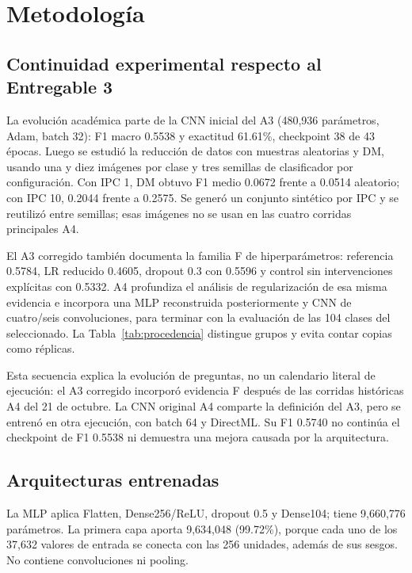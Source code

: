 \section{Metodología}
\subsection{Continuidad experimental respecto al Entregable 3}
La evolución académica parte de la CNN inicial del A3 (480,936 parámetros,
Adam, batch 32): F1 macro 0.5538 y exactitud 61.61\%, checkpoint 38 de 43 épocas.
Luego se estudió la reducción de datos con muestras aleatorias y DM, usando
una y diez imágenes por clase y tres semillas de clasificador por configuración.
Con IPC 1, DM obtuvo F1 medio 0.0672 frente a 0.0514 aleatorio; con IPC 10,
0.2044 frente a 0.2575. Se generó un conjunto sintético por IPC y se reutilizó
entre semillas; esas imágenes no se usan en las cuatro corridas principales A4.

El A3 corregido también documenta la familia F de hiperparámetros: referencia
0.5784, LR reducido 0.4605, dropout 0.3 con 0.5596 y control sin intervenciones
explícitas con 0.5332. A4 profundiza el análisis de regularización de esa misma
evidencia e incorpora una MLP reconstruida posteriormente y CNN de cuatro/seis
convoluciones, para terminar con la evaluación de las 104 clases del seleccionado.
La Tabla~\ref{tab:procedencia} distingue grupos y evita contar copias como réplicas.


Esta secuencia explica la evolución de preguntas, no un calendario literal de
ejecución: el A3 corregido incorporó evidencia F después de las corridas históricas
A4 del 21 de octubre. La CNN original A4 comparte la definición del A3, pero se
entrenó en otra ejecución, con batch 64 y DirectML. Su F1 0.5740 no continúa el
checkpoint de F1 0.5538 ni demuestra una mejora causada por la arquitectura.

\subsection{Arquitecturas entrenadas}
La MLP aplica Flatten, Dense256/ReLU, dropout 0.5 y Dense104; tiene 9,660,776
parámetros. La primera capa aporta 9,634,048 (99.72\%), porque cada uno de los
37,632 valores de entrada se conecta con las 256 unidades, además de sus sesgos.
No contiene convoluciones ni pooling.

